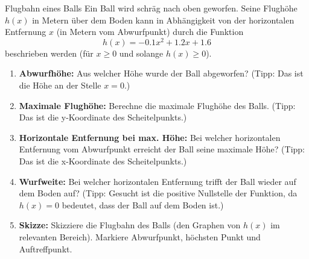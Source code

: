 \begin{aufgabenumgebung}{Flugbahn eines Balls}
Ein Ball wird schräg nach oben geworfen. Seine Flughöhe $h(x)$ in Metern über dem Boden kann in Abhängigkeit von der horizontalen Entfernung $x$ (in Metern vom Abwurfpunkt) durch die Funktion
\[ h(x) = -0.1x^2 + 1.2x + 1.6 \]
beschrieben werden (für $x \ge 0$ und solange $h(x) \ge 0$).
\begin{enumerate}
    \item \textbf{Abwurfhöhe:} Aus welcher Höhe wurde der Ball abgeworfen? (Tipp: Das ist die Höhe an der Stelle $x=0$.)
    \item \textbf{Maximale Flughöhe:} Berechne die maximale Flughöhe des Balls. (Tipp: Das ist die y-Koordinate des Scheitelpunkts.)
    \item \textbf{Horizontale Entfernung bei max. Höhe:} Bei welcher horizontalen Entfernung vom Abwurfpunkt erreicht der Ball seine maximale Höhe? (Tipp: Das ist die x-Koordinate des Scheitelpunkts.)
    \item \textbf{Wurfweite:} Bei welcher horizontalen Entfernung trifft der Ball wieder auf dem Boden auf? (Tipp: Gesucht ist die positive Nullstelle der Funktion, da $h(x)=0$ bedeutet, dass der Ball auf dem Boden ist.)
    \item \textbf{Skizze:} Skizziere die Flugbahn des Balls (den Graphen von $h(x)$ im relevanten Bereich). Markiere Abwurfpunkt, höchsten Punkt und Auftreffpunkt.
\end{enumerate}
\end{aufgabenumgebung}

